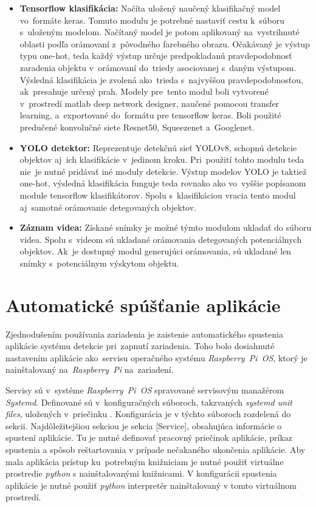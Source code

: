 \begin{itemize}
                \item \textbf{Tensorflow klasifikácia:} Načíta uložený naučený klasifikačný model vo~formáte keras. Tomuto modulu je potrebné nastaviť cestu k~súboru s~uloženým modelom. Načítaný model je potom aplikovaný na~vystrihnuté oblasti podľa orámovaní z~pôvodného farebného obrazu. Očakávaný je výstup typu one-hot, teda každý výstup určuje predpokladanú pravdepodobnosť zaradenia objektu v~orámovaní do~triedy asociovanej s~daným výstupom. Výsledná klasifikácia je zvolená ako~trieda s~najvyššou pravdepodobnosťou, ak~presahuje určený prah. Modely pre~tento modul boli vytvorené v~prostredí matlab deep network designer, naučené pomocou transfer learning, a~exportované do~formátu pre tensorflow keras. Boli použité predučené konvolučné siete Resnet50, Squeezenet a~Googlenet.
                \item \textbf{YOLO detektor:} Reprezentuje detekčnú sieť YOLOv8, schopnú detekcie objektov aj~ich klasifikácie v~jedinom kroku. Pri~použití tohto modulu teda nie~je nutné pridávať iné moduly detekcie. Výstup modelov YOLO je taktiež one-hot, výsledná klasifikácia funguje teda rovnako ako vo~vyššie popísanom module tensorflow klasifikátorov. Spolu s~klasifikáciou vracia tento modul aj~samotné orámovanie detegovaných objektov.
                \item \textbf{Záznam videa:} Získané snímky je možné týmto modulom ukladať do súboru videa. Spolu s~videom sú ukladané orámovania detegovaných potenciálnych objektov. Ak~je dostupný modul generujúci orámovania, sú ukladané len snímky s~potenciálnym výskytom objektu.
            \end{itemize}

    \section{Automatické spúšťanie aplikácie}
        Zjednodušením používania zariadenia je zaistenie automatického spustenia aplikácie systému detekcie pri~zapnutí zariadenia. Toho bolo dosiahnuté nastavením aplikácie ako~servisu operačného systému \emph{Raspberry~Pi~OS}, ktorý je nainštalovaný na~\emph{Raspberry~Pi} na~zariadení.

        Servisy sú v~systéme \emph{Raspberry~Pi~OS} spravované servisovým manažérom \emph{Systemd}. Definované sú v~konfiguračných súboroch, takzvaných \emph{systemd unit files}, uložených v~priečinku . Konfigurácia je v týchto súboroch rozdelená do sekcii. Najdôležitejšiou sekciou je sekcia [Service], obsahujúca informácie o spustení aplikácie. Tu je nutné definovať pracovný priečinok aplikácie, príkaz spustenia a spôsob reštartovania v prípade nečakaného ukončenia aplikácie. Aby mala aplikácia prístup ku~potrebným knižniciam je nutné použiť virtuálne prostredie \emph{python} s nainštalovanými knižnicami. V konfigurácii spustenia aplikácie je nutné použiť \emph{python} interpretér nainštalovaný v tomto virtuálnom prostredí.

